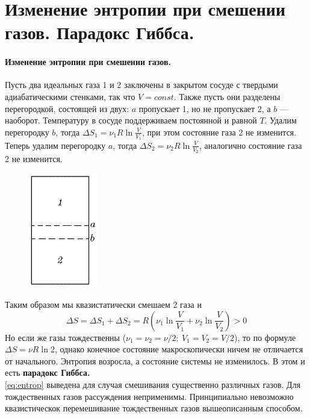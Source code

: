 \section{\normalsize Изменение энтропии при смешении газов. Парадокс Гиббса.}
\paragraph{Изменение энтропии при смешении газов.} Пусть два идеальных газа 1 и 2 заключены в закрытом сосуде с твердыми адиабатическими стенками, так что $V=const$. Также пусть они разделены перегородкой, состоящей из двух: $a$ пропускает 1, но не пропускает 2, а $b$ --- наоборот. Температуру в сосуде поддерживаем постоянной и равной $T$. Удалим перегородку $b$, тогда $\Delta S_1=\nu_1R\ln \frac{V}{V_1}$, при этом состояние газа 2 не изменится. Теперь удалим перегородку $a$, тогда $\Delta S_2=\nu_2R\ln \frac{V}{V_2}$, аналогично состояние газа 2 не изменится.

\begin{figure}
	\includegraphics[width=30mm]{ris31.png}	
\end{figure}
 Таким образом мы квазистатически смешаем 2 газа и 
\begin{equation}
\label{eq:entrop}
 \Delta S=\Delta S_1 + \Delta S_2=R\left(\nu_1 \ln \frac{V}{V_1}+\nu_2\ln \frac{V}{V_2}\right)>0
 \end{equation}
 Но если же газы тождественны ($\nu_1=\nu_2=\nu/2;\ V_1=V_2=V/2$), то по формуле $\Delta S=\nu R \ln 2$, однако конечное состояние макроскопически ничем не отличается от начального. Энтропия возросла, а состояние системы не изменилось. В этом и есть \textbf{парадокс Гиббса.}\\
 \eqref{eq:entrop} выведена для случая смешивания существенно различных газов. Для тождественных газов рассуждения неприменимы. Принципиально невозможно квазистическок перемешивание тождественных газов вышеописанным способом.